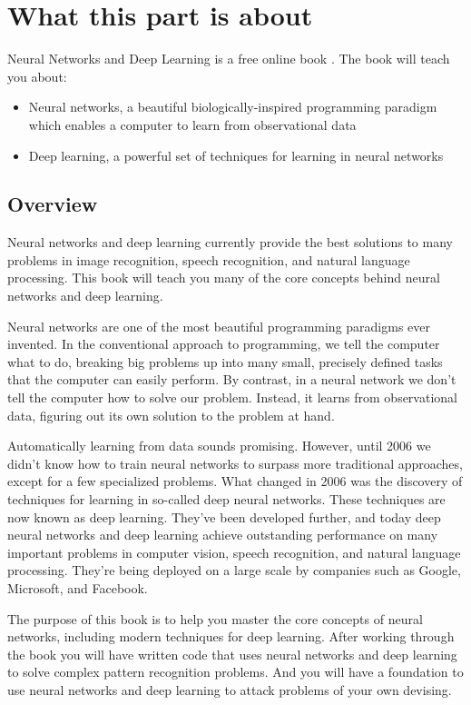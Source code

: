 
\chapter*{What this part is about}


Neural Networks and Deep Learning is a free online book \cite{Nielsen2015}. The book will teach you about: 
\begin{itemize}
\item  Neural networks, a beautiful biologically-inspired programming paradigm which enables a computer to learn from observational data 
\item Deep learning, a powerful set of techniques for learning in neural networks 
\end{itemize}


\section*{Overview}

Neural networks and deep learning currently provide the best solutions to many problems in image recognition, speech recognition, and natural language processing. This book will teach you many of the core concepts behind neural networks and deep learning. 

Neural networks are one of the most beautiful programming paradigms ever invented. In the conventional approach to programming, we tell the computer what to do, breaking big problems up into many small, precisely defined tasks that the computer can easily perform. By contrast, in a neural network we don't tell the computer how to solve our problem. Instead, it learns from observational data, figuring out its own solution to the problem at hand.

Automatically learning from data sounds promising. However, until 2006 we didn't know how to train neural networks to surpass more traditional approaches, except for a few specialized problems. What changed in 2006 was the discovery of techniques for learning in so-called deep neural networks. These techniques are now known as deep learning. They've been developed further, and today deep neural networks and deep learning achieve outstanding performance on many important problems in computer vision, speech recognition, and natural language processing. They're being deployed on a large scale by companies such as Google, Microsoft, and Facebook.

The purpose of this book is to help you master the core concepts of neural networks, including modern techniques for deep learning. After working through the book you will have written code that uses neural networks and deep learning to solve complex pattern recognition problems. And you will have a foundation to use neural networks and deep learning to attack problems of your own devising.

